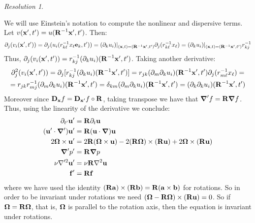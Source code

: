 \documentclass[10pt,a4paper]{article}
\theoremstyle{definition}
\theoremstyle{remark}
\newtheorem*{res}{Resolution}
\begin{document}
\begin{res}
\begin{itemize}
          We will use Einstein's notation to compute the nonlinear and dispersive terms. Let $v(\boldsymbol{\mathrm{x}}',t') = u(\boldsymbol{\mathrm{R}}^{-1}\boldsymbol{\mathrm{x}}',t')$. Then:
          \begin{equation*}
            \partial_j(v_i(\boldsymbol{\mathrm{x}}',t'))=\partial_j(u_i(r^{-1}_{k\ell} x_\ell\boldsymbol{\mathrm{e}}_k,t')) = (\partial_ku_i)|_{(\boldsymbol{\mathrm{x}},t)=(\boldsymbol{\mathrm{R}}^{-1}\boldsymbol{\mathrm{x}}',t')}\partial_j(r^{-1}_{k\ell} x_\ell) = (\partial_ku_i)|_{(\boldsymbol{\mathrm{x}},t)=(\boldsymbol{\mathrm{R}}^{-1}\boldsymbol{\mathrm{x}}',t')}r^{-1}_{kj}
          \end{equation*}
          Thus, $\partial_j(v_i(\boldsymbol{\mathrm{x}}',t'))=r^{-1}_{kj}(\partial_ku_i)(\boldsymbol{\mathrm{R}}^{-1}\boldsymbol{\mathrm{x}}',t')$. Taking another derivative:
          \begin{multline*}
            \partial_j^2(v_i(\boldsymbol{\mathrm{x}}',t'))=\partial_j[r^{-1}_{kj}(\partial_ku_i)(\boldsymbol{\mathrm{R}}^{-1}\boldsymbol{\mathrm{x}}',t')]=r_{jk}(\partial_m\partial_ku_i)(\boldsymbol{\mathrm{R}}^{-1}\boldsymbol{\mathrm{x}}',t')\partial_j(r^{-1}_{m\ell}x_\ell)=\\=r_{jk}r^{-1}_{mj}(\partial_m\partial_ku_i)(\boldsymbol{\mathrm{R}}^{-1}\boldsymbol{\mathrm{x}}',t')= \delta_{km}(\partial_m\partial_ku_i)(\boldsymbol{\mathrm{R}}^{-1}\boldsymbol{\mathrm{x}}',t')=(\partial_k\partial_ku_i)(\boldsymbol{\mathrm{R}}^{-1}\boldsymbol{\mathrm{x}}',t')
          \end{multline*}
          Moreover since $\boldsymbol{\mathrm{D}}_{\boldsymbol{\mathrm{x}}}f=\boldsymbol{\mathrm{D}}_{\boldsymbol{\mathrm{x}}'}f\circ \boldsymbol{\mathrm{R}}$, taking transpose we have that $\grad'f=\boldsymbol{\mathrm{R}} \grad f$.
          Thus, using the linearity of the derivative we conclude:
          \begin{align*}
            \partial_{t'}\boldsymbol{\mathrm{u}}'        & = \boldsymbol{\mathrm{R}} \partial_t\boldsymbol{\mathrm{u}}                                                                                    \\
            (\boldsymbol{\mathrm{u}}'\cdot\grad')\boldsymbol{\mathrm{u}}' & = \boldsymbol{\mathrm{R}}(\boldsymbol{\mathrm{u}}\cdot\grad)\boldsymbol{\mathrm{u}}                                                                             \\
            2\boldsymbol{\mathrm{\Omega}}\times\boldsymbol{\mathrm{u}}'     & =  2\boldsymbol{\mathrm{R}}( \boldsymbol{\mathrm{\Omega}}\times\boldsymbol{\mathrm{u}})-2(\boldsymbol{\mathrm{R}}\boldsymbol{\mathrm{\Omega}})\times(\boldsymbol{\mathrm{R}}\boldsymbol{\mathrm{u}}) + 2\boldsymbol{\mathrm{\Omega}}\times(\boldsymbol{\mathrm{R}}\boldsymbol{\mathrm{u}}) \\
            \grad' p'                   & = \boldsymbol{\mathrm{R}}\grad p                                                                                              \\
            \nu\nabla'^2\boldsymbol{\mathrm{u}}'         & = \nu\boldsymbol{\mathrm{R}}\nabla^2\boldsymbol{\mathrm{u}}                                                                                    \\
            \boldsymbol{\mathrm{f}}'                     & = \boldsymbol{\mathrm{R}}\boldsymbol{\mathrm{f}}
          \end{align*}
          where we have used the identity $(\boldsymbol{\mathrm{R}}\boldsymbol{\mathrm{a}})\times(\boldsymbol{\mathrm{R}}\boldsymbol{\mathrm{b}})= \boldsymbol{\mathrm{R}}(\boldsymbol{\mathrm{a}}\times\boldsymbol{\mathrm{b}})$ for rotations. So in order to be invariant under rotations we need $(\boldsymbol{\mathrm{\Omega}}-\boldsymbol{\mathrm{R}}\boldsymbol{\mathrm{\Omega}})\times(\boldsymbol{\mathrm{R}}\boldsymbol{\mathrm{u}})=0$. So if $\boldsymbol{\mathrm{\Omega}}=\boldsymbol{\mathrm{R}}\boldsymbol{\mathrm{\Omega}}$, that is, $\boldsymbol{\mathrm{\Omega}}$ is parallel to the rotation axis, then the equation is invariant under rotations.

\end{itemize}
\end{res}
\end{document}
